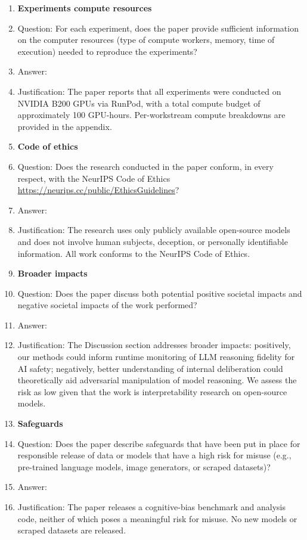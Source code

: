 \begin{enumerate}
\item {\bf Experiments compute resources}
    \item[] Question: For each experiment, does the paper provide sufficient information on the computer resources (type of compute workers, memory, time of execution) needed to reproduce the experiments?
    \item[] Answer: \answerYes{}
    \item[] Justification: The paper reports that all experiments were conducted on NVIDIA B200 GPUs via RunPod, with a total compute budget of approximately 100 GPU-hours. Per-workstream compute breakdowns are provided in the appendix.
\item {\bf Code of ethics}
    \item[] Question: Does the research conducted in the paper conform, in every respect, with the NeurIPS Code of Ethics \url{https://neurips.cc/public/EthicsGuidelines}?
    \item[] Answer: \answerYes{}
    \item[] Justification: The research uses only publicly available open-source models and does not involve human subjects, deception, or personally identifiable information. All work conforms to the NeurIPS Code of Ethics.
\item {\bf Broader impacts}
    \item[] Question: Does the paper discuss both potential positive societal impacts and negative societal impacts of the work performed?
    \item[] Answer: \answerYes{}
    \item[] Justification: The Discussion section addresses broader impacts: positively, our methods could inform runtime monitoring of LLM reasoning fidelity for AI safety; negatively, better understanding of internal deliberation could theoretically aid adversarial manipulation of model reasoning. We assess the risk as low given that the work is interpretability research on open-source models.
\item {\bf Safeguards}
    \item[] Question: Does the paper describe safeguards that have been put in place for responsible release of data or models that have a high risk for misuse (e.g., pre-trained language models, image generators, or scraped datasets)?
    \item[] Answer: \answerNA{}
    \item[] Justification: The paper releases a cognitive-bias benchmark and analysis code, neither of which poses a meaningful risk for misuse. No new models or scraped datasets are released.

\end{enumerate}
